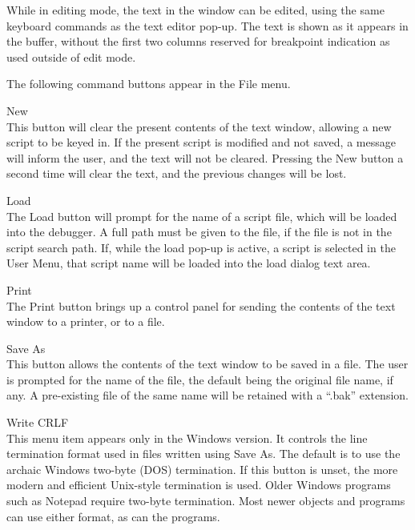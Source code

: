 While in editing mode, the text in the window can be edited, using the
same keyboard commands as the text editor pop-up.  The text is shown
as it appears in the buffer, without the first two columns reserved
for breakpoint indication as used outside of edit mode.

The following command buttons appear in the {\cb File} menu.

\begin{description}
\item{\cb New}\\
This button will clear the present contents of the text window,
allowing a new script to be keyed in.  If the present script is
modified and not saved, a message will inform the user, and the text
will not be cleared.  Pressing the {\cb New} button a second time will
clear the text, and the previous changes will be lost.

\item{\cb Load}\\
The {\cb Load} button will prompt for the name
of a script file, which will be loaded into the debugger.  A full path
must be given to the file, if the file is not in the script search
path.  If, while the load pop-up is active, a script is selected in
the {\cb User Menu}, that script name will be loaded into the load
dialog text area.

\item{\cb Print}\\
The {\cb Print} button brings up a control panel for sending the
contents of the text window to a printer, or to a file.

\item{\cb Save As}\\
This button allows the contents of the text window to be saved in a
file.  The user is prompted for the name of the file, the default
being the original file name, if any.  A pre-existing file of the same
name will be retained with a ``{\vt .bak}'' extension.

\item{\cb Write CRLF}\\
This menu item appears only in the Windows version.  It controls the
line termination format used in files written using {\cb Save As}. 
The default is to use the archaic Windows two-byte (DOS) termination. 
If this button is unset, the more modern and efficient Unix-style
termination is used.  Older Windows programs such as Notepad require
two-byte termination.  Most newer objects and programs can use either
format, as can the {\XicTools} programs.


\end{description}
